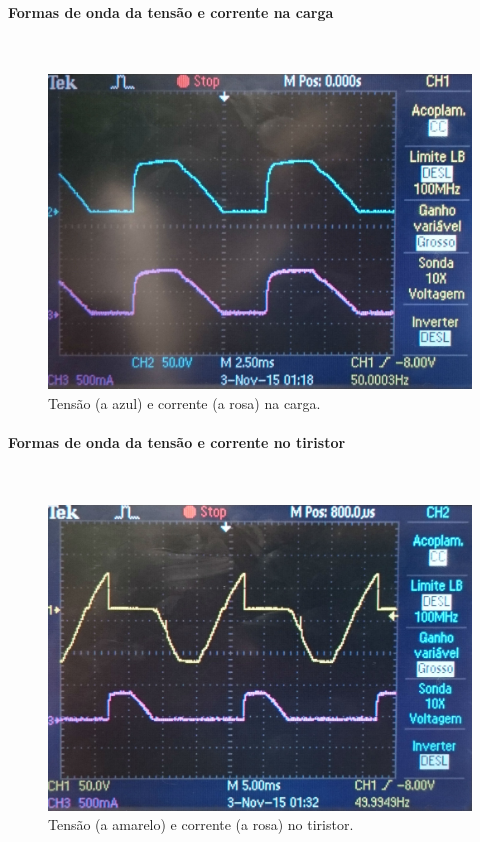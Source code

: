 \documentclass[a4paper,11pt]{article}
\numberwithin{equation}{section}
\begin{document}
\paragraph{Formas de onda da tensão e corrente na carga} \mbox{}\


\begin{figure}[H]
	\centering
	\includegraphics[keepaspectratio=true, scale=0.13]{img/DSC_0182}
	\caption{Tensão (a azul) e corrente (a rosa) na carga.}
	\label{fig:tccarga}
	\vspace{-0.8em}
\end{figure}

\paragraph{Formas de onda da tensão e corrente no tiristor} \mbox{}\

\begin{figure}[H]
	\centering
	\includegraphics[keepaspectratio=true, scale=0.13]{img/DSC_0183}
	\caption{Tensão (a amarelo) e corrente (a rosa) no tiristor.}
	\label{fig:tctiristor}
	\vspace{-0.8em}
\end{figure}
\end{document}
